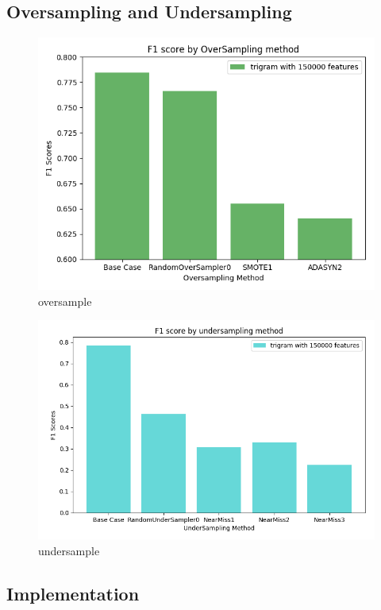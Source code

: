 \subsection{Oversampling and Undersampling}

\begin{figure}[h]
\caption{oversample}
\centering
\includegraphics[scale=0.5]{graphs/oversampling.png}
\end{figure}


\begin{figure}[h]
\caption{undersample}
\centering
\includegraphics[scale=0.5]{graphs/undersample.png}
\end{figure}

\subsection{Implementation}